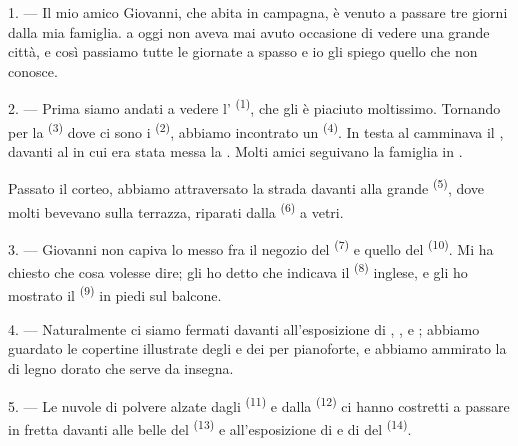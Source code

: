 \VUsaut{4.0mm}
\VUsaut{3.0mm}

\VUsaut{3.0mm}

1. --- Il mio amico Giovanni, che abita in campagna, è venuto a passare tre giorni
dalla mia famiglia.  a oggi non aveva mai avuto occasione di vedere una
grande città, e così passiamo tutte le giornate a spasso e io gli spiego quello che
non conosce.

2. --- Prima siamo andati a vedere l' \textsuperscript{(1)}, che
gli è piaciuto moltissimo. Tornando per la  \textsuperscript{(3)} dove ci
sono i  \textsuperscript{(2)}, abbiamo incontrato un
 \textsuperscript{(4)}. In testa al 
camminava il , davanti al  in cui era stata messa
la . Molti amici seguivano la famiglia in .

Passato il corteo, abbiamo attraversato la strada davanti alla grande
 \textsuperscript{(5)}, dove molti  bevevano
 sulla terrazza, riparati dalla  \textsuperscript{(6)} a
vetri.

3. --- Giovanni non capiva lo  messo fra il negozio del
 \textsuperscript{(7)} e quello del 
\textsuperscript{(10)}. Mi ha chiesto che cosa volesse dire; gli ho detto che indicava
il  \textsuperscript{(8)} inglese, e gli ho mostrato il
 \textsuperscript{(9)} in piedi sul balcone.

\VUsaut{3.0mm}

4. --- Naturalmente ci siamo fermati davanti all'esposizione di
, ,  e
; abbiamo guardato le copertine illustrate degli 
e dei  per pianoforte, e abbiamo ammirato la  di legno
dorato che serve da insegna.

5. --- Le nuvole di polvere alzate dagli  \textsuperscript{(11)} e
dalla  \textsuperscript{(12)} ci hanno costretti a passare in
fretta davanti alle belle  del 
\textsuperscript{(13)} e all'esposizione di  e di  del
 \textsuperscript{(14)}.

